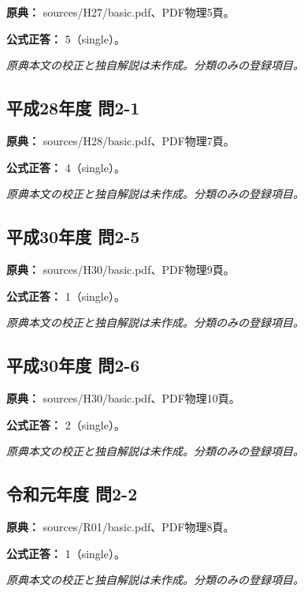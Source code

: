 \noindent\textbf{原典：} sources/H27/basic.pdf、PDF物理5頁。

\textbf{公式正答：} 5（single）。

\par\textit{原典本文の校正と独自解説は未作成。分類のみの登録項目。}

\subsection{平成28年度 問2-1}
\label{q:h28-reg-basic-2-1}

\noindent\textbf{原典：} sources/H28/basic.pdf、PDF物理7頁。

\textbf{公式正答：} 4（single）。

\par\textit{原典本文の校正と独自解説は未作成。分類のみの登録項目。}

\subsection{平成30年度 問2-5}
\label{q:h30-reg-basic-2-5}

\noindent\textbf{原典：} sources/H30/basic.pdf、PDF物理9頁。

\textbf{公式正答：} 1（single）。

\par\textit{原典本文の校正と独自解説は未作成。分類のみの登録項目。}

\subsection{平成30年度 問2-6}
\label{q:h30-reg-basic-2-6}

\noindent\textbf{原典：} sources/H30/basic.pdf、PDF物理10頁。

\textbf{公式正答：} 2（single）。

\par\textit{原典本文の校正と独自解説は未作成。分類のみの登録項目。}

\subsection{令和元年度 問2-2}
\label{q:r01-reg-basic-2-2}

\noindent\textbf{原典：} sources/R01/basic.pdf、PDF物理8頁。

\textbf{公式正答：} 1（single）。

\par\textit{原典本文の校正と独自解説は未作成。分類のみの登録項目。}

